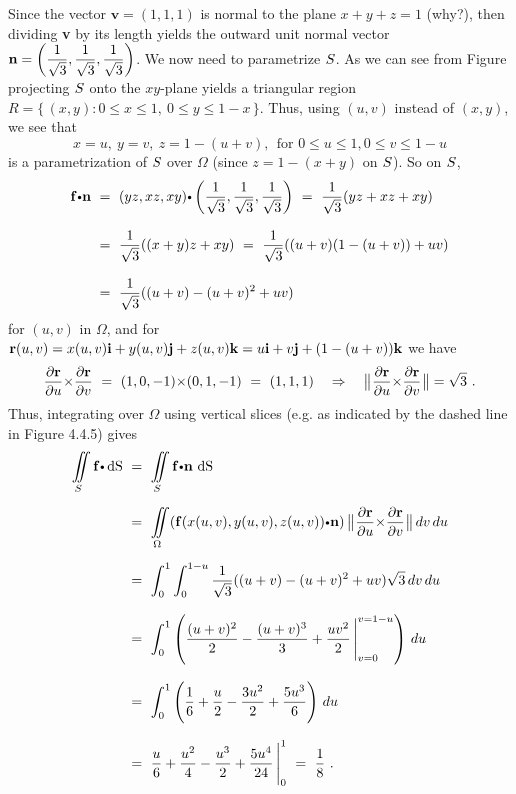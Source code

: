 \begin{solu}

 Since the vector $\textbf{v} = (1,1,1)$ is normal to the plane $x+y+z=1$ (why?), then
 dividing \textbf{v} by its length yields the outward unit normal vector $\mathbf{ n} = \left( \dfrac{1}{\sqrt{3}},
 \dfrac{1}{\sqrt{3}},\dfrac{1}{\sqrt{3}} \right)$. We now need to parametrize $S$. As we can see from Figure
 projecting $S$ onto the $xy$-plane yields a triangular region
 $R= \lbrace\,(x,y): 0 \le x \le 1,~ 0 \le y \le 1-x\,\rbrace$. Thus, using $(u,v)$ instead of $(x,y)$, we see that
 \begin{displaymath}
  x=u,~ y=v,~ z=1-(u+v),~~\text{for~} 0 \le u \le 1, 0 \le v \le 1-u
 \end{displaymath}
 is a parametrization of $S$ over $\Omega$ (since $z=1-(x+y)$ on $S$). So on $S$,
 \begin{align*}
  \Dotprod{\vector{f}}{\vector{n}} ~&=~
   \Dotprod{(yz,xz,xy)}{\left( \dfrac{1}{\sqrt{3}},\dfrac{1}{\sqrt{3}},\dfrac{1}{\sqrt{3}} \right)}
   ~=~ \dfrac{1}{\sqrt{3}}(yz+xz+xy)\\[8pt]
   &=~ \dfrac{1}{\sqrt{3}}((x+y)z+xy)
   ~=~ \dfrac{1}{\sqrt{3}}((u+v)(1-(u+v))+uv)\\[8pt]
   &=~ \dfrac{1}{\sqrt{3}}((u+v)- (u+v)^2 + uv)
 \end{align*}
 for $(u,v)$ in $\Omega$, and for $\mathbf{ r}(u,v)=x(u,v)\mathbf{ i} + y(u,v)\mathbf{ j} + z(u,v)\mathbf{ k} = u\mathbf{ i} +
 v\mathbf{ j} + (1-(u+v))\mathbf{ k}$ we have
 \begin{displaymath}
  \dfrac{\partial \mathbf{ r}}{\partial u} \mathbf{\times} \dfrac{\partial \mathbf{ r}}{\partial v} ~=~
   (1,0,-1) \mathbf{\times} (0,1,-1) ~=~ (1,1,1) \quad\Rightarrow\quad
  \bigl\lVert\mspace{1mu}\dfrac{\partial \mathbf{ r}}{\partial u} \mathbf{\times} \dfrac{\partial \mathbf{ r}}{\partial v}\mspace{1mu}\bigr\rVert = \sqrt{3}~.
 \end{displaymath}
 Thus, integrating over $\Omega$ using vertical slices (e.g. as indicated by the dashed line in Figure 4.4.5) gives
 \begin{align*}
  \diint\limits_{\superficie} \Dotprod{\vector{f}}{\d \S} ~&=~
   \diint\limits_{\superficie} \Dotprod{\vector{f}}{\vector{n}}\,\d \S\\[6pt]
   &=~ \diint\limits_{\Omega} (\Dotprod{\vector{f}(x(u,v),y(u,v),z(u,v))}{\vector{n}})\,
   \Norm{\Crossprod{\dfrac{\partial \vector{r}}{\partial u}}{\dfrac{\partial \vector{r}}{\partial v}}}\,dv\,du\\[6pt]
   &=~ \dint_0^1 \dint_0^{1-u} \dfrac{1}{\sqrt{3}}((u+v)- (u+v)^2 + uv) \sqrt{3}\,dv\,du\\[8pt]
   &=~ \dint_0^1 \left( \dfrac{(u+v)^2}{2} - \dfrac{(u+v)^3}{3} + \dfrac{uv^2}{2}\,\Bigg|_{v=0}^{v=1-u} \right)\,du\\[8pt]
   &=~ \dint_0^1 \left( \dfrac{1}{6} + \dfrac{u}{2} - \dfrac{3u^2}{2} + \dfrac{5u^3}{6} \right)\,du\\[8pt]
   &=~ \dfrac{u}{6} + \dfrac{u^2}{4} - \dfrac{u^3}{2} + \dfrac{5u^4}{24}\,\Bigg|_0^1 ~=~ \dfrac{1}{8}~.
 \end{align*}

\end{solu}

